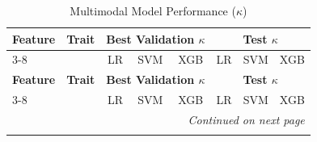 \begin{longtable}{llcccccc}
\caption{Multimodal Model Performance ($\kappa$)}\label{tab:multimodal_results_full} \\

\hline
\textbf{Feature} & \textbf{Trait} & \multicolumn{3}{c}{\textbf{Best Validation $\kappa$}} & \multicolumn{3}{c}{\textbf{Test $\kappa$}} \\
\cline{3-8}
 &  & LR & SVM & XGB & LR & SVM & XGB \\
\hline
\endfirsthead

\hline
\textbf{Feature} & \textbf{Trait} & \multicolumn{3}{c}{\textbf{Best Validation $\kappa$}} & \multicolumn{3}{c}{\textbf{Test $\kappa$}} \\
\cline{3-8}
 &  & LR & SVM & XGB & LR & SVM & XGB \\
\hline
\endhead

\hline
\multicolumn{8}{r}{\textit{Continued on next page}} \\
\endfoot

\hline
\endlastfoot


\end{longtable}
